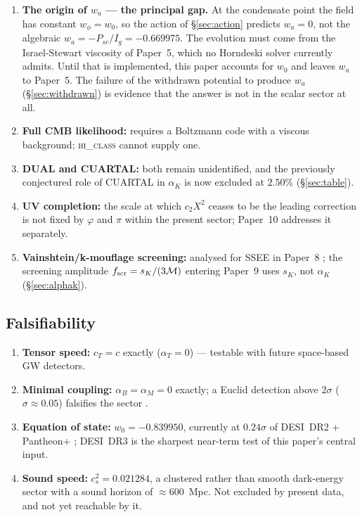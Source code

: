 \documentclass[12pt,a4paper]{article}
\newcommand{\MIRA}{\mathcal{M}}
\begin{document}
\begin{enumerate}
  \item \textbf{The origin of $w_a$ --- the principal gap.}
    At the condensate point the field has constant $w_\phi = w_0$, so the
    action of §\ref{sec:action} predicts $w_a = 0$, not the algebraic
    $w_a = -P_{sc}/I_g = -0.669975$.  The evolution must come from the
    Israel-Stewart viscosity of Paper~5, which no Horndeski solver
    currently admits.  Until that is implemented, this paper accounts for
    $w_0$ and leaves $w_a$ to Paper~5.  The failure of the withdrawn
    potential to produce $w_a$ (§\ref{sec:withdrawn}) is evidence that
    the answer is not in the scalar sector at all.
  \item \textbf{Full CMB likelihood:} requires a Boltzmann code with a
    viscous background; \textsc{hi\_class} cannot supply one.
  \item \textbf{DUAL and CUARTAL:} both remain unidentified, and the
    previously conjectured role of CUARTAL in $\alpha_K$ is now excluded
    at $2.50\%$ (§\ref{sec:table}).
  \item \textbf{UV completion:} the scale at which $c_2X^2$ ceases to be
    the leading correction is not fixed by $\varphi$ and $\pi$ within the
    present sector; Paper~10 addresses it separately.
  \item \textbf{Vainshtein/k-mouflage screening:} analysed for SSEE in
    Paper~8 \citep{ssee_paper8}; the screening amplitude
    $f_{\rm scr} = s_K/(3\MIRA)$ entering Paper~9
    \citep{Verde2019,Kamionkowski2023} uses $s_K$, not $\alpha_K$
    (§\ref{sec:alphak}).
\end{enumerate}

\subsection{Falsifiability}

\begin{enumerate}
  \item \textbf{Tensor speed:} $c_T = c$ exactly ($\alpha_T = 0$) —
    testable with future space-based GW detectors.
  \item \textbf{Minimal coupling:} $\alpha_B = \alpha_M = 0$ exactly; a
    Euclid detection above $2\sigma$ ($\sigma \approx 0.05$) falsifies
    the sector \citep{euclid2024}.
  \item \textbf{Equation of state:} $w_0 = -0.839950$, currently at
    $0.24\sigma$ of DESI~DR2 + Pantheon+ \citep{desidr2_2025}; DESI~DR3
    is the sharpest near-term test of this paper's central input.
  \item \textbf{Sound speed:} $c_s^2 = 0.021284$, a clustered rather than
    smooth dark-energy sector with a sound horizon of $\approx 600$~Mpc.
    Not excluded by present data, and not yet reachable by it.
\end{enumerate}
\end{document}
